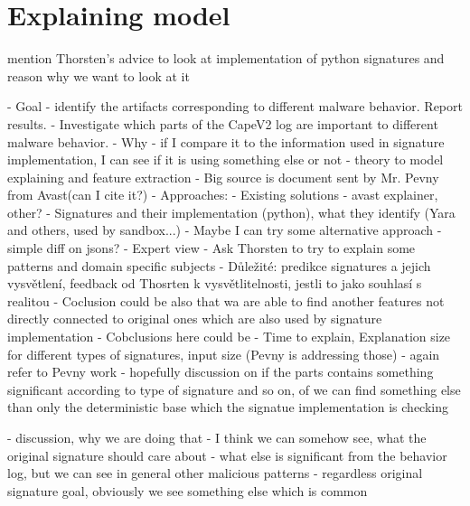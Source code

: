 \chapter{Explaining model}


mention Thorsten's advice to look at implementation of python signatures and reason why we want to look at it

- Goal 
- identify the artifacts corresponding to different malware behavior. Report results.
- Investigate which parts of the CapeV2 log are important to different malware behavior. 
- Why - if I compare it to the information used in signature implementation, I can see if it is using something else or not
- theory to model explaining and feature extraction - Big source is document sent by Mr. Pevny from Avast(can I cite it?)
- Approaches:
- Existing solutions - avast explainer, other?
- Signatures and their implementation (python), what they identify (Yara and others, used by sandbox...)
- Maybe I can try some alternative approach - simple diff on jsons?
- Expert view
  - Ask Thorsten to try to explain some patterns and domain specific subjects 
  - Důležité: predikce signatures a jejich vysvětlení, feedback od Thosrten k vysvětlitelnosti, jestli to jako souhlasí s realitou 
- Coclusion could be also that wa are able to find another features not directly connected to original ones which are also used by signature implementation
- Cobclusions here could be
- Time to explain, Explanation size for different types of signatures, input size (Pevny is addressing those)
- again refer to Pevny work
- hopefully discussion on if the parts contains something significant according to type of signature and so on, of we can find something else than only the deterministic base which the signatue implementation is checking



- discussion, why we are doing that - I think we can somehow see, what the original signature should care about - what else is significant from the behavior log, but we can see in general other malicious patterns - regardless original signature goal, obviously we see something else which is common